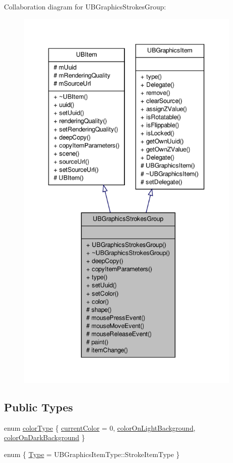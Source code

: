Collaboration diagram for U\-B\-Graphics\-Strokes\-Group\-:
\nopagebreak
\begin{figure}[H]
\begin{center}
\leavevmode
\includegraphics[height=550pt]{d6/d59/class_u_b_graphics_strokes_group__coll__graph}
\end{center}
\end{figure}
\subsection*{Public Types}
\begin{DoxyCompactItemize}
\item 
enum \hyperlink{class_u_b_graphics_strokes_group_aafc5defeb806eb61efedfa57d2a35237}{color\-Type} \{ \hyperlink{class_u_b_graphics_strokes_group_aafc5defeb806eb61efedfa57d2a35237aa1578878d1515dff5db323ca8403fc32}{current\-Color} =  0, 
\hyperlink{class_u_b_graphics_strokes_group_aafc5defeb806eb61efedfa57d2a35237a34e78e4969fa8b31473b7cf4cc01a682}{color\-On\-Light\-Background}, 
\hyperlink{class_u_b_graphics_strokes_group_aafc5defeb806eb61efedfa57d2a35237a8239dfc657024d6a94ed55070207ee18}{color\-On\-Dark\-Background}
 \}
\item 
enum \{ \hyperlink{class_u_b_graphics_strokes_group_a9881a46b6d4aa934b82ece9ff755ecb8acab072a353265ba95c2ddec1598a7802}{Type} =  U\-B\-Graphics\-Item\-Type\-:\-:Stroke\-Item\-Type
 \}
\end{DoxyCompactItemize}
